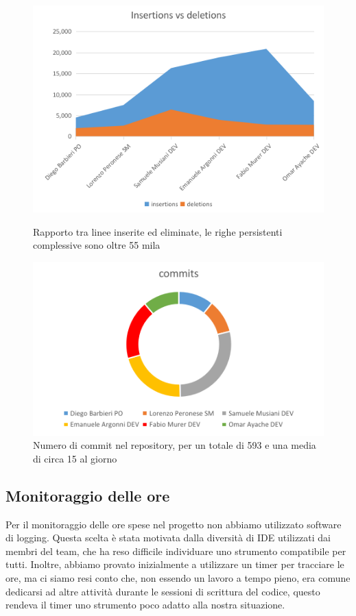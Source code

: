 \documentclass{article}
\begin{document}
\begin{figure}[H] 
    \centering 
    \begin{minipage}[t]{0.44\textwidth} 
        \centering 
        \includegraphics[width=\textwidth]{report-stats_insdel} 
        \caption{Rapporto tra linee inserite ed eliminate, le righe persistenti complessive sono oltre 55 mila} 
        \label{fig:stats_insdel} 
    \end{minipage} 
    \hfill 
    \begin{minipage}[t]{0.51\textwidth} 
        \centering 
        \includegraphics[width=\textwidth]{report-stats_commits} 
        \caption{Numero di commit nel repository, per un totale di 593 e una media di circa 15 al giorno} 
        \label{fig:stats_commits} 
    \end{minipage}
\end{figure}

\subsection{Monitoraggio delle ore}
Per il monitoraggio delle ore spese nel progetto non abbiamo utilizzato software di logging. Questa scelta è stata motivata dalla diversità di 
IDE utilizzati dai membri del team, che ha reso difficile individuare uno strumento compatibile per tutti. Inoltre, abbiamo provato inizialmente 
a utilizzare un timer per tracciare le ore, ma ci siamo resi conto che, non essendo un lavoro a tempo pieno, era comune dedicarsi ad altre 
attività durante le sessioni di scrittura del codice, questo rendeva il timer uno strumento poco adatto alla nostra situazione.
\end{document}
